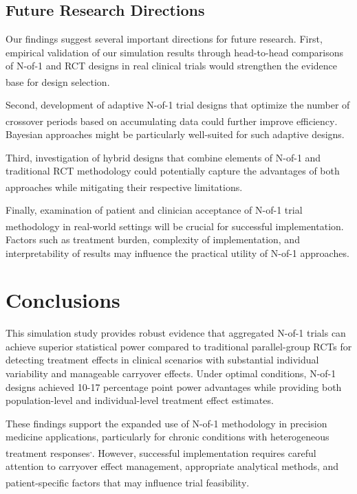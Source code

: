 \documentclass[
  11pt,
]{article}
\begin{document}
\subsection{Future Research
Directions}\label{future-research-directions}

Our findings suggest several important directions for future research.
First, empirical validation of our simulation results through
head-to-head comparisons of N-of-1 and RCT designs in real clinical
trials would strengthen the evidence base for design
selection\textsuperscript{}.

Second, development of adaptive N-of-1 trial designs that optimize the
number of crossover periods based on accumulating data could further
improve
efficiency\textsuperscript{}.
Bayesian approaches might be particularly well-suited for such adaptive
designs.

Third, investigation of hybrid designs that combine elements of N-of-1
and traditional RCT methodology could potentially capture the advantages
of both approaches while mitigating their respective
limitations\textsuperscript{}.

Finally, examination of patient and clinician acceptance of N-of-1 trial
methodology in real-world settings will be crucial for successful
implementation\textsuperscript{}.
Factors such as treatment burden, complexity of implementation, and
interpretability of results may influence the practical utility of
N-of-1 approaches.

\section{Conclusions}\label{conclusions}

This simulation study provides robust evidence that aggregated N-of-1
trials can achieve superior statistical power compared to traditional
parallel-group RCTs for detecting treatment effects in clinical
scenarios with substantial individual variability and manageable
carryover effects. Under optimal conditions, N-of-1 designs achieved
10-17 percentage point power advantages while providing both
population-level and individual-level treatment effect estimates.

These findings support the expanded use of N-of-1 methodology in
precision medicine applications, particularly for chronic conditions
with heterogeneous treatment
responses\textsuperscript{,}.
However, successful implementation requires careful attention to
carryover effect management, appropriate analytical methods, and
patient-specific factors that may influence trial
feasibility\textsuperscript{}.
\end{document}
